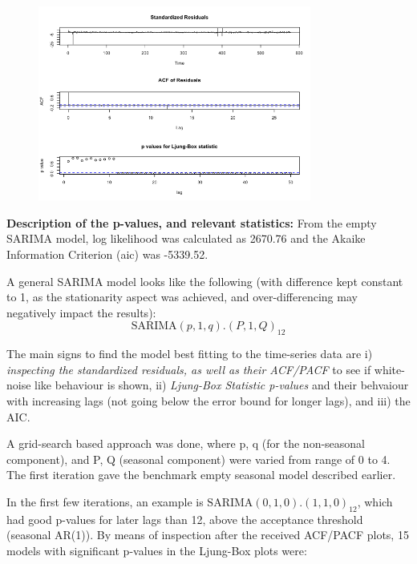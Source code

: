 \documentclass[a4paper,11pt]{article}
\begin{document}
    \begin{figure}[H]
        \centering
        \includegraphics[width=0.8\textwidth]{figure-markdown_strict/unnamed-chunk-3-5.png}
        \label{fig:f6}
    \end{figure}

    \textbf{Description of the p-values, and relevant statistics:} From the empty SARIMA model, log likelihood was calculated as 2670.76 and the Akaike Information Criterion (aic) was -5339.52. 

    A general SARIMA model looks like the following (with difference kept constant to 1, as the stationarity aspect was achieved, and over-differencing may negatively impact the results):
    \[\text{SARIMA}(p,1,q).(P,1,Q)_{12}\]

    The main signs to find the model best fitting to the time-series data are i) \textit{inspecting the standardized residuals, as well as their ACF/PACF} to see if white-noise like behaviour is shown, ii) \textit{Ljung-Box Statistic p-values} and their behvaiour with increasing lags (not going below the error bound for longer lags), and iii) the AIC. 

    A grid-search based approach was done, where p, q (for the non-seasonal component), and P, Q (seasonal component) were varied from range of 0 to 4. The first iteration gave the benchmark empty seasonal model described earlier. 
    
    In the first few iterations, an example is $\text{SARIMA}(0,1,0).(1,1,0)_{12}$, which had good p-values for later lags than 12, above the acceptance threshold (seasonal AR(1)). By means of inspection after the received ACF/PACF plots, 15 models with significant p-values in the Ljung-Box plots were:

    \vspace{-20pt}
\end{document}

